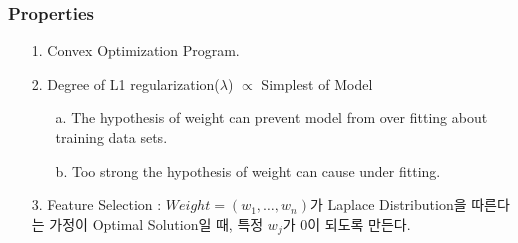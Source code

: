 \documentclass{article}
\begin{document}
\subsubsection{Properties}
\begin{itemize}
    \item [1.] Convex Optimization Program.
    \item [2.] Degree of L1 regularization($\lambda$) $\propto$ Simplest of Model
        \begin{itemize}
            \item[a.] The hypothesis of weight can prevent model from over fitting about training data sets.
            \item[b.] Too strong the hypothesis of weight can cause under fitting.
        \end{itemize}
    \item[3.] Feature Selection : $Weight = (w_1, \dots,w_n)$가 Laplace Distribution을 따른다는 가정이 Optimal Solution일 때, 특정 $w_j$가 0이 되도록 만든다.
\end{itemize}
\end{document}
